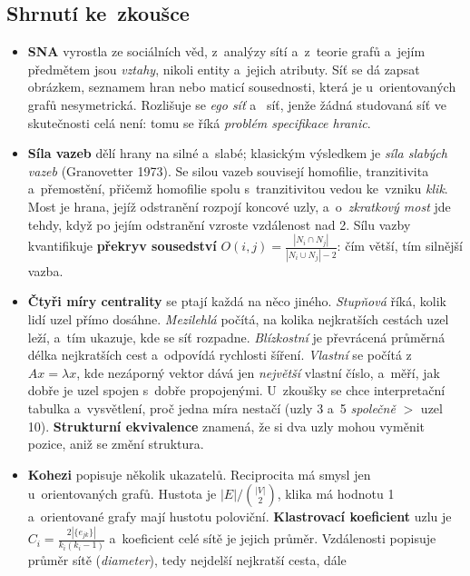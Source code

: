 \documentclass[11pt,a4paper]{article}
\theoremstyle{definition}
\begin{document}
\subsection{Shrnutí ke~zkoušce}

\begin{itemize}
\item \textbf{SNA} vyrostla ze sociálních věd, z~analýzy sítí a~z~teorie grafů a~jejím
      předmětem jsou \emph{vztahy}, nikoli entity a~jejich atributy. Síť se dá zapsat obrázkem,
      seznamem hran nebo maticí sousednosti, která je u~orientovaných grafů nesymetrická.
      Rozlišuje se \emph{ego síť} a~ síť, jenže žádná studovaná síť ve skutečnosti
      celá není: tomu se říká \emph{problém specifikace hranic}.
\item \textbf{Síla vazeb} dělí hrany na silné a~slabé; klasickým výsledkem je \emph{síla slabých
      vazeb} (Granovetter 1973). Se silou vazeb souvisejí homofilie, tranzitivita a~přemostění,
      přičemž homofilie spolu s~tranzitivitou vedou ke~vzniku \emph{klik}. Most je hrana, jejíž
      odstranění rozpojí koncové uzly, a~o~\emph{zkratkový most} jde tehdy, když po jejím
      odstranění vzroste vzdálenost nad 2. Sílu vazby kvantifikuje \textbf{překryv sousedství}
      $O(i,j)=\frac{|N_i\cap N_j|}{|N_i\cup N_j|-2}$: čím větší, tím silnější vazba.
\item \textbf{Čtyři míry centrality} se ptají každá na něco jiného. \emph{Stupňová} říká, kolik
      lidí uzel přímo dosáhne. \emph{Mezilehlá} počítá, na kolika nejkratších cestách uzel leží,
      a~tím ukazuje, kde se síť rozpadne. \emph{Blízkostní} je převrácená průměrná délka
      nejkratších cest a~odpovídá rychlosti šíření. \emph{Vlastní} se počítá z~$Ax=\lambda x$,
      kde nezáporný vektor dává jen \emph{největší} vlastní číslo, a~měří, jak dobře je uzel
      spojen s~dobře propojenými. U~zkoušky se chce interpretační tabulka a~vysvětlení, proč
      jedna míra nestačí (uzly 3 a~5 \emph{společně} $>$ uzel 10). \textbf{Strukturní
      ekvivalence} znamená, že si dva uzly mohou vyměnit pozice, aniž se změní struktura.
\item \textbf{Kohezi} popisuje několik ukazatelů. Reciprocita má smysl jen u~orientovaných
      grafů. Hustota je $|E|/\binom{|V|}{2}$, klika má hodnotu 1 a~orientované grafy mají
      hustotu poloviční. \textbf{Klastrovací koeficient} uzlu je
      $C_i=\frac{2|\{e_{jk}\}|}{k_i(k_i-1)}$ a~koeficient celé sítě je jejich průměr.
      Vzdálenosti popisuje průměr sítě (\emph{diameter}), tedy nejdelší nejkratší cesta, dále

\end{itemize}
\end{document}
